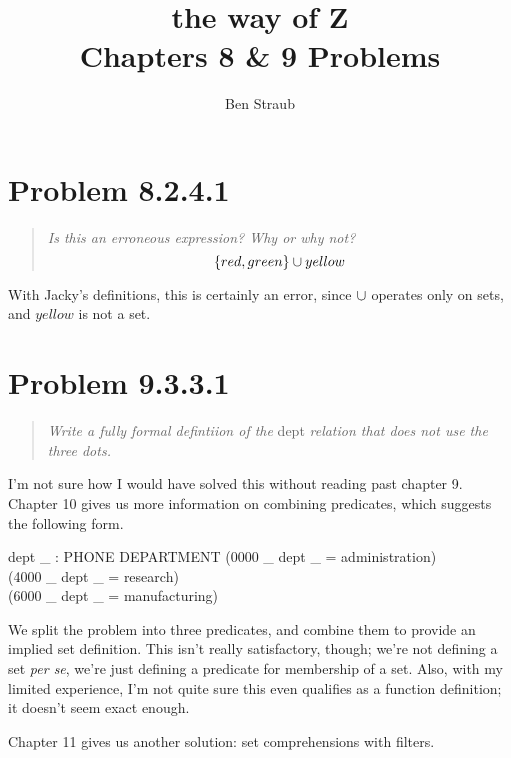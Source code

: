 \documentclass[10pt]{article}
\begin{document}
\title{the way of Z \\ Chapters 8 \& 9 Problems}
\author{Ben Straub}
\maketitle


\section{Problem 8.2.4.1}
\begin{quote}
  {\it Is this an erroneous expression?  Why or why not?
    \[ \{red, green\} \cup yellow \]}
\end{quote}

With Jacky's definitions, this is certainly an error, since $\cup$ operates only on sets, and
$yellow$ is not a set.



\section{Problem 9.3.3.1}
\begin{quote}
  {\it Write a fully formal defintiion of the} dept {\it relation that does not use the three dots.}
\end{quote}

I'm not sure how I would have solved this without reading past chapter 9.  Chapter 10 gives us more
information on combining predicates, which suggests the following form.

\begin{axdef}
  dept \_ : PHONE \rel DEPARTMENT
  \where
  (0000 \leq \_  \land dept \_ = administration) \lor \\
  (4000 \leq \_  \land dept \_ = research) \lor       \\
  (6000 \leq \_  \land dept \_ = manufacturing)
\end{axdef}

We split the problem into three predicates, and combine them to provide an implied set definition.
This isn't really satisfactory, though; we're not defining a set \textit{per se}, we're just
defining a predicate for membership of a set.  Also, with my limited experience, I'm not quite sure
this even qualifies as a function definition; it doesn't seem exact enough.

Chapter 11 gives us another solution: set comprehensions with filters.
\end{document}
